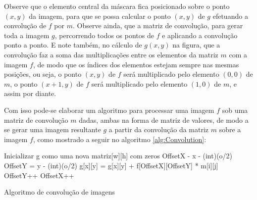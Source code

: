 Observe que o elemento central da máscara fica posicionado sobre o ponto \((x,y)\) da imagem, para que se possa calcular o ponto \((x,y)\) de \(g\) efetuando a convolução de \(f\) por \(m\). Observe ainda, que a matriz de convolução, para gerar toda a imagem \(g\), percorrendo todos os pontos de \(f\)  e aplicando a convolução ponto a ponto. E note também, no cálculo de \(g(x,y)\) na figura, que a convolução faz a soma das multiplicações entre os elementos da matriz \(m\) com a imagem \(f\), de modo que os índices dos elementos estejam sempre nas mesmas posições, ou seja, o ponto \((x,y)\) de \(f\) será multiplicado pelo elemento \((0,0)\) de \(m\), o ponto \((x+1,y)\) de \(f\) será multiplicado pelo elemento \((1,0)\) de \(m\), e assim por diante.

Com isso pode-se elaborar um algoritmo para processar uma imagem \(f\) sob uma matriz de convolução \(m\) dadas, ambas na forma de matriz de valores, de modo a se gerar uma imagem resultante \(g\) a partir da convolução da matriz \(m\) sobre a imagem \(f\), como mostrado a seguir no algoritmo \ref{alg:Convolution}:

\begin{algorithm}[H]
\SetAlgoLined
{}
Inicializar g como uma nova matriz[w][h] com zeros\;
{
  {
    OffsetX - x - (int)(o/2)\;
    {
      OffsetY = y - (int)(o/2)\;
      {
        {
        g[x][y] = g[x][y] + f[OffsetX][OffsetY] * m[i][j]\; 
        }
        OffsetY++\;
      }
      OffsetX++\;
    }
  }
}
\caption{Algoritmo de convolução de imagens}
\label{alg:Convolution}
\end{algorithm}

